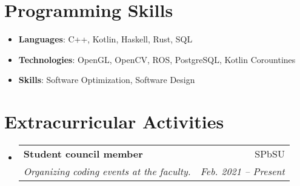 \documentclass[letterpaper,11pt]{article}
\makeatletter
\newcommand{\resumeSubheading}[4]{
  \vspace{-1pt}\item
    \begin{tabular*}{0.97\textwidth}{l@{\extracolsep{\fill}}r}
      \textbf{#1} & #2 \\
      \textit{\small#3} & \textit{\small #4} \\
    \end{tabular*}\vspace{-5pt}
}
\newcommand{\resumeSubHeadingListStart}{\begin{itemize}[leftmargin=*]}
\newcommand{\resumeSubHeadingListEnd}{\end{itemize}}
\makeatother
\begin{document}
\section{Programming Skills}
  \resumeSubHeadingListStart
    \item{
      \textbf{Languages}{: C++, Kotlin, Haskell, Rust, SQL }
    }
    \item{
      \textbf{Technologies}{: OpenGL, OpenCV, ROS, PostgreSQL, Kotlin Corountines } \\
    }
    \item{
      \textbf{Skills}{: Software Optimization, Software Design }
    }
  \resumeSubHeadingListEnd

\section{Extracurricular Activities}
  \resumeSubHeadingListStart
    \resumeSubheading{Student council member}{SPbSU}
      {Organizing coding events at the faculty.}{Feb. 2021 -- Present}
  \resumeSubHeadingListEnd


\end{document}
